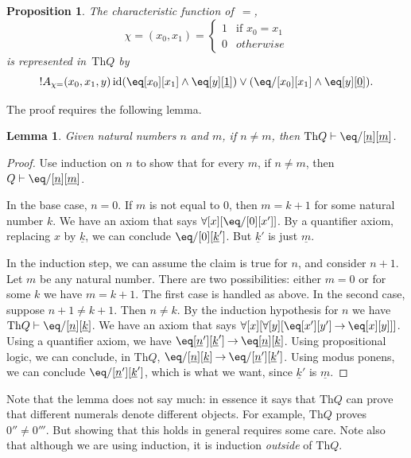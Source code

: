 \documentclass[10pt,a4paper]{article}
\theoremstyle{plain}
\newtheorem{lem}[thm]{Lemma}
\newtheorem{prop}[thm]{Proposition}
\theoremstyle{definition}
\theoremstyle{remark}
\newenvironment{explain}{}{}
\newcommand*{\ollabel}[1]{\label{#1}}
\providecommand{\lif}{\mathbin{\rightarrow}}
\providecommand{\lforall}{\mathord{\forall}}
\providecommand{\Proves}{\mathrel{\vdash}}
\providecommand{\Th}{\ensuremath{\mathrm{Th}}}
\providecommand{\num}[1]{\underline{#1}}
\providecommand{\Char}{\chi}
\providecommand{\ident}{\operatorname{id}}
\begin{document}
\begin{prop}
\ollabel{prop:rep-id}
The characteristic function of~$=$,
\[
\Char{=}(x_0, x_1) =
\begin{cases}
  1 & \text{if } x_0 =x_1\\
  0 & otherwise
\end{cases}
\]
is represented in~$\Th{Q}$ by
\[
  !A_{\Char{=}}(x_0, x_1, y) \ident (\eq[x_0][x_1] \land \eq[y][\num{1}]) \lor (\eq/[x_0][x_1] \land
\eq[y][\num{0}]).
\]
\end{prop}

The proof requires the following lemma.

\begin{lem}
\ollabel{lem:q-proves-neq} Given natural numbers $n$ and $m$, if $n
\neq m$, then $\Th{Q} \Proves \eq/[\num n][\num m]$.
\end{lem}

\begin{proof}
Use induction on $n$ to show that for every $m$, if $n \neq m$, then
$Q \Proves \eq/[\num n][\num m]$.

In the base case, $n = 0$. If $m$ is not equal to $0$, then $m = k +
1$ for some natural number $k$. We have an axiom that says
$\lforall[x][\eq/[0][x']]$. By a quantifier axiom, replacing $x$ by
  $\num k$, we can conclude $\eq/[0][\num k']$. But $\num k'$ is just
  $\num m$.

In the induction step, we can assume the claim is true for $n$, and
consider $n+1$. Let $m$ be any natural number. There are two
possibilities: either $m = 0$ or for some $k$ we have $m = k+1$. The
first case is handled as above. In the second case, suppose $n+1 \neq
k+1$. Then $n \neq k$. By the induction hypothesis for $n$ we have
$\Th{Q} \Proves \eq/[\num n][\num k]$. We have an axiom that says
$\lforall[x][\lforall[y][\eq[x'][y'] \lif \eq[x][y]]]$. Using a
quantifier axiom, we have $\eq[\num n'][\num k'] \lif \eq[\num n][\num
  k]$. Using propositional logic, we can conclude, in $\Th{Q}$,
$\eq/[\num n][\num k] \lif \eq/[\num n'][\num k']$. Using modus
ponens, we can conclude $\eq/[\num n'][\num k']$, which is what we want,
since $\num k'$ is $\num m$.
\end{proof}

\begin{explain}
Note that the lemma does not say much: in essence it says that $\Th{Q}$ can
prove that different numerals denote different objects. For example,
$\Th{Q}$ proves $0'' \neq 0'''$. But showing that this holds in general
requires some care. Note also that although we are using induction, it
is induction \emph{outside} of $\Th{Q}$.
\end{explain}
\end{document}
